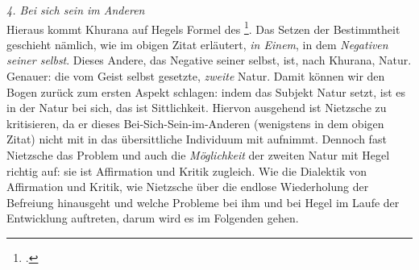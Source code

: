 \documentclass[12pt, a4paper, openany]{report}
\begin{document}
\emph{4. Bei sich sein im Anderen}\\
Hieraus kommt Khurana auf Hegels Formel des \footcite[][283]{khurana_freiheit_2017}.
Das Setzen der Bestimmtheit geschieht nämlich, wie im obigen Zitat erläutert, \emph{in Einem}, in dem \emph{Negativen seiner selbst}. 
Dieses Andere, das Negative seiner selbst, ist, nach Khurana, Natur. 
Genauer: die vom Geist selbst gesetzte, \emph{zweite} Natur.
Damit können wir den Bogen zurück zum ersten Aspekt schlagen: 
indem das Subjekt Natur setzt, ist es in der Natur bei sich, das ist Sittlichkeit.
Hiervon ausgehend ist Nietzsche zu kritisieren, da er dieses Bei-Sich-Sein-im-Anderen (wenigstens in dem obigen Zitat) nicht mit in das übersittliche Individuum mit aufnimmt.  
Dennoch fast Nietzsche das Problem und auch die \emph{Möglichkeit} der zweiten Natur mit Hegel richtig auf: 
sie ist Affirmation und Kritik zugleich.
Wie die Dialektik von Affirmation und Kritik, wie Nietzsche über die endlose Wiederholung der Befreiung hinausgeht und welche Probleme bei ihm und bei Hegel im Laufe der Entwicklung auftreten, darum wird es im Folgenden gehen.
\end{document}
